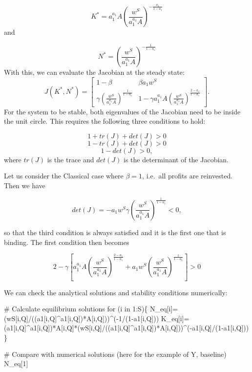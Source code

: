 \documentclass[
  letterpaper,
  DIV=11,
  numbers=noendperiod]{scrreprt}
\newenvironment{Shaded}{\begin{snugshade}}{\end{snugshade}}
\newcommand{\CommentTok}[1]{\textcolor[rgb]{0.37,0.37,0.37}{#1}}
\newcommand{\ControlFlowTok}[1]{\textcolor[rgb]{0.00,0.23,0.31}{#1}}
\newcommand{\DecValTok}[1]{\textcolor[rgb]{0.68,0.00,0.00}{#1}}
\newcommand{\NormalTok}[1]{\textcolor[rgb]{0.00,0.23,0.31}{#1}}
\newcommand{\OtherTok}[1]{\textcolor[rgb]{0.00,0.23,0.31}{#1}}
\newcommand{\SpecialCharTok}[1]{\textcolor[rgb]{0.37,0.37,0.37}{#1}}
\begin{document}
\[
K^*=a_1^{a_1}A\left(\frac{w^S}{a_1^{a_1}A}\right)^{-\frac{a_1}{1-a_1}}
\] and

\[
N^*=\left(\frac{w^S}{a_1^{a_1}A}\right)^{-\frac{1}{1-a_1}}
\] With this, we can evaluate the Jacobian at the steady state: \[
J(K^*, N^*)=\begin{bmatrix} 1-\beta & \beta a_1 w^S \\ \gamma \left(\frac{w^S}{a_1^{a_1}A}\right)^{\frac{1}{1-a_1}} & 1-\gamma a_1^{a_1}A \left(\frac{w^S}{a_1^{a_1}A}\right)^{\frac{2-a_1}{1-a_1}} 
\end{bmatrix}.
\] For the system to be stable, both eigenvalues of the Jacobian need to
be inside the unit circle. This requires the following three conditions
to hold:

\[
1+tr(J)+det(J)>0
\] \[
1-tr(J)+det(J)>0
\] \[
1-det(J)>0,
\] where \(tr(J)\) is the trace and \(det(J)\) is the determinant of the
Jacobian.

Let us consider the Classical case where \(\beta=1\), i.e.~all profits
are reinvested. Then we have

\[
det(J)=-a_1w^S \gamma \left(\frac{w^S}{a_1^{a_1}A}\right)^{\frac{1}{1-a_1}}<0,
\]

so that the third condition is always satisfied and it is the first one
that is binding. The first condition then becomes

\[
2-\gamma  \left[a_1^{a_1} A \left(\frac{w^S}{a_1^{a_1}A}\right)^{\frac{2-a_1}{1-a_1}} + a_1 w^S\left(\frac{w^S}{a_1^{a_1}A}\right)^{\frac{1}{1-a_1}} \right]>0
\]

We can check the analytical solutions and stability conditions
numerically:

\begin{Shaded}
\begin{Highlighting}[]
\CommentTok{\# Calculate equilibrium solutions}
\ControlFlowTok{for}\NormalTok{ (i }\ControlFlowTok{in} \DecValTok{1}\SpecialCharTok{:}\NormalTok{S)\{}
\NormalTok{  N\_eq[i]}\OtherTok{=}\NormalTok{(wS[i,Q]}\SpecialCharTok{/}\NormalTok{((a1[i,Q]}\SpecialCharTok{\^{}}\NormalTok{a1[i,Q])}\SpecialCharTok{*}\NormalTok{A[i,Q]))}\SpecialCharTok{\^{}}\NormalTok{(}\SpecialCharTok{{-}}\DecValTok{1}\SpecialCharTok{/}\NormalTok{(}\DecValTok{1}\SpecialCharTok{{-}}\NormalTok{a1[i,Q]))}
\NormalTok{  K\_eq[i]}\OtherTok{=}\NormalTok{(a1[i,Q]}\SpecialCharTok{\^{}}\NormalTok{a1[i,Q])}\SpecialCharTok{*}\NormalTok{A[i,Q]}\SpecialCharTok{*}\NormalTok{(wS[i,Q]}\SpecialCharTok{/}\NormalTok{((a1[i,Q]}\SpecialCharTok{\^{}}\NormalTok{a1[i,Q])}\SpecialCharTok{*}\NormalTok{A[i,Q]))}\SpecialCharTok{\^{}}\NormalTok{(}\SpecialCharTok{{-}}\NormalTok{a1[i,Q]}\SpecialCharTok{/}\NormalTok{(}\DecValTok{1}\SpecialCharTok{{-}}\NormalTok{a1[i,Q]))}
\NormalTok{\}}

\CommentTok{\# Compare with numerical solutions (here for the example of Y, baseline)}
\NormalTok{N\_eq[}\DecValTok{1}\NormalTok{]}
\end{Highlighting}
\end{Shaded}
\end{document}
